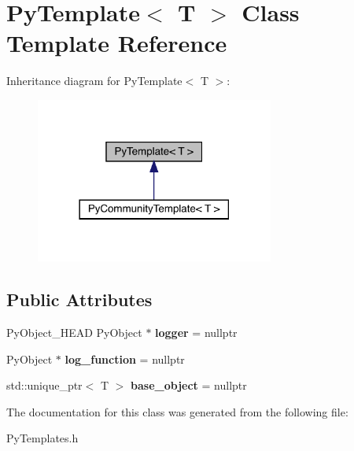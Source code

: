 \hypertarget{class_py_template}{}\section{Py\+Template$<$ T $>$ Class Template Reference}
\label{class_py_template}


Inheritance diagram for Py\+Template$<$ T $>$\+:
\nopagebreak
\begin{figure}[H]
\begin{center}
\leavevmode
\includegraphics[width=222pt]{class_py_template__inherit__graph}
\end{center}
\end{figure}
\subsection*{Public Attributes}
\begin{DoxyCompactItemize}
\item 
Py\+Object\+\_\+\+H\+E\+AD Py\+Object $\ast$ {\bfseries logger} = nullptr\hypertarget{class_py_template_a5b741a472639d65f9bcad29afa16ec99}{}\label{class_py_template_a5b741a472639d65f9bcad29afa16ec99}

\item 
Py\+Object $\ast$ {\bfseries log\+\_\+function} = nullptr\hypertarget{class_py_template_a98bb8152faa73d028342d5cf260f0372}{}\label{class_py_template_a98bb8152faa73d028342d5cf260f0372}

\item 
std\+::unique\+\_\+ptr$<$ T $>$ {\bfseries base\+\_\+object} = nullptr\hypertarget{class_py_template_abcd20aea11103e6764f38cf5ed4085ca}{}\label{class_py_template_abcd20aea11103e6764f38cf5ed4085ca}

\end{DoxyCompactItemize}


The documentation for this class was generated from the following file\+:\begin{DoxyCompactItemize}
\item 
Py\+Templates.\+h\end{DoxyCompactItemize}

